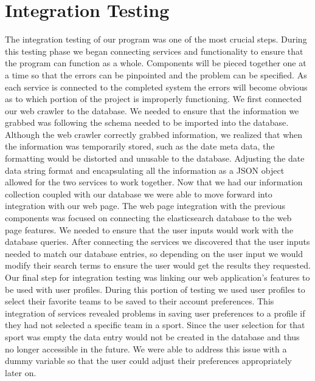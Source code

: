 \section{Integration Testing}
\par The integration testing of our program was one of the most crucial steps. During this testing phase we began connecting services and functionality to ensure that the program can function as a whole. Components will be pieced together one at a time so that the errors can be pinpointed and the problem can be specified. As each service is connected to the completed system the errors will become obvious as to which portion of the project is improperly functioning. We first connected our web crawler to the database. We needed to ensure that the information we grabbed was following the schema needed to be imported into the database. Although the web crawler correctly grabbed information, we realized that when the information was temporarily stored, such as the date meta data, the formatting would be distorted and unusable to the database. Adjusting the date data string format and encapsulating all the information as a JSON object allowed for the two services to work together. Now that we had our information collection coupled with our database we were able to move forward into integration with our web page. The web page integration with the previous components was focused on connecting the elasticsearch database to the web page features. We needed to ensure that the user inputs would work with the database queries. After connecting the services we discovered that the user inputs needed to match our database entries, so depending on the user input we would modify their search terms to ensure the user would get the results they requested. Our final step for integration testing was linking our web application’s features to be used with user profiles. During this portion of testing we used user profiles to select their favorite teams to be saved to their account preferences. This integration of services revealed problems in saving user preferences to a profile if they had not selected a specific team in a sport. Since the user selection for that sport was empty the data entry would not be created in the database and thus no longer accessible in the future. We were able to address this issue with a dummy variable so that the user could adjust their preferences appropriately later on.  


